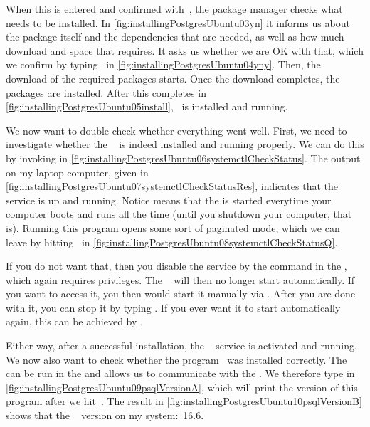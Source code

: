 When this is entered and confirmed with~\keys{\enter}, the package manager checks what needs to be installed.
In \cref{fig:installingPostgresUbuntu03yn} it informs us about the package itself and the dependencies that are needed, as well as how much download and space that requires.
It asks us whether we are OK with that, which we confirm by typing~ in \cref{fig:installingPostgresUbuntu04yny}.
Then, the download of the required packages starts.
Once the download completes, the packages are installed.
After this completes in \cref{fig:installingPostgresUbuntu05install}, \postgresql\ is installed and running.

We now want to double-check whether everything went well.
First, we need to investigate whether the \postgresql\   is indeed installed and running properly.
We can do this by invoking  in \cref{fig:installingPostgresUbuntu06systemctlCheckStatus}.
The output on my laptop computer, given in \cref{fig:installingPostgresUbuntu07systemctlCheckStatusRes}, indicates that the service is up and running.
Notice  means that the  is started everytime your computer boots and runs all the time (until you shutdown your computer, that is).
Running this program opens some sort of paginated mode, which we can leave by hitting~ in \cref{fig:installingPostgresUbuntu08systemctlCheckStatusQ}.%
%
\begin{sloppypar}%
If you do not want that, then you disable the service by the command  in the , which again requires  privileges.
The \postgresql\  will then no longer start automatically.
If you want to access it, you then would start it manually via .
After you are done with it, you can stop it by typing .
If you ever want it to start automatically again, this can be achieved by .%
\end{sloppypar}%
%
Either way, after a successful installation, the \postgresql\  service is activated and running.
We now also want to check whether the  program \psql\ was installed correctly.
The  can be run in the  and allows us to communicate with the  .
We therefore type  in \cref{fig:installingPostgresUbuntu09psqlVersionA}, which will print the version of this program after we hit~\keys{\enter}.
The result in \cref{fig:installingPostgresUbuntu10psqlVersionB} shows that the \psql\  version on my system:~16.6.

